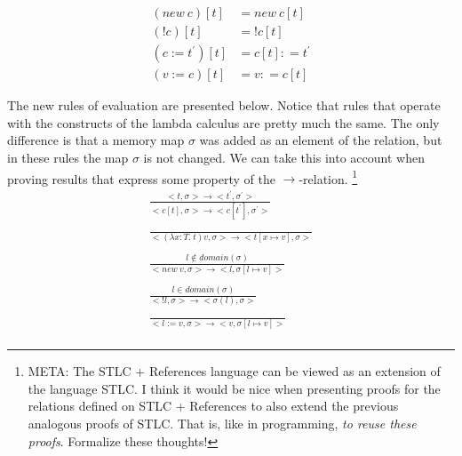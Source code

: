 \begin{align*}
(new \ c)[t] &= new  \ c[t] \\
(!c)[t] &= !c[t] \\
(c := t^{'})[t] &= c[t] : = t^{'} \\
(v := c)[t] &= v : = c[t]
\end{align*}

The new rules of evaluation are presented below. Notice that rules that operate with the constructs of the lambda calculus are pretty much the same. The only difference is that a memory map $\sigma$ was added as an element of the relation, but in these rules the map $\sigma$ is not changed. We can take this into account when proving results that express some property of the $\to$-relation. \footnote{META: The STLC + References language can be viewed as an extension of the language STLC. I think it would be nice when presenting proofs for the relations defined on STLC + References to also extend the previous analogous proofs of STLC. That is, like in programming,  \emph{to reuse these proofs}. Formalize these thoughts!}
\begin{align*}
\frac
{{<}t, \sigma{>} \to {<} t^{'}, \sigma^{'}{>}}
{{<}c[t], \sigma{>} \to {<}c[t^{'}], \sigma^{'}{>}} \label{rule:R-C} \tag{R-C}\\
\\
\frac
{}
{{<}(\lambda x:T . \ t)v, \sigma {>} \to {<} t[x \mapsto v], \sigma {>} }\label{rule:R-lambda} \tag{R-$\lambda$} \\
\\
\frac
{l \not\in domain(\sigma)}
{ {<} new \ v , \sigma {>} \to {<} l, \sigma[l \mapsto v] {>} }  \label{rule:R-new} \tag{R-new}\\
\\
\frac
{l \in domain(\sigma)}
{ {<} !l, \sigma {>} \to {<} \sigma(l), \sigma {>}} \label{rule:R-!} \tag{R-!}\\
\\
\frac
{}
{ {<} l := v, \sigma {>} \to {<} v, \sigma[l \mapsto v] {>} } \label{rule:R-assign} \tag{R-assign} 
\\
\end{align*}

